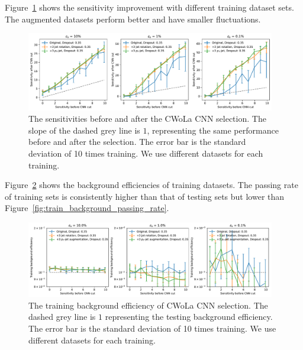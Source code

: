 \documentclass[12pt]{article}
\begin{document}
        Figure~\ref{fig:sensitivity_improvement_background_subtraction_dropout_35} shows the sensitivity improvement with different training dataset sets. The augmented datasets perform better and have smaller fluctuations. 
        \begin{figure}[htpb]
            \centering
            \includegraphics[width=0.97\textwidth]{HVmodel_sensitivity_improvement_origin_jet_aug_3_pt_jet_aug_3_bkg_subtraction_dp_35.pdf}
            \caption{The sensitivities before and after the CWoLa CNN selection. The slope of the dashed grey line is $1$, representing the same performance before and after the selection. The error bar is the standard deviation of 10 times training. We use different datasets for each training.}
            \label{fig:sensitivity_improvement_background_subtraction_dropout_35}
        \end{figure}

        Figure~\ref{fig:train_background_passing_rate_dropout_35} shows the background efficiencies of training datasets. The passing rate of training sets is consistently higher than that of testing sets but lower than Figure~\ref{fig:train_background_passing_rate}. 
        \begin{figure}[htpb]
            \centering
            \includegraphics[width=0.97\textwidth]{HVmodel_train_B_passing_rate_origin_jet_aug_3_pt_jet_aug_3_dp_35.pdf}
            \caption{The training background efficiency of CWoLa CNN selection. The dashed grey line is $1$ representing the testing background efficiency. The error bar is the standard deviation of 10 times training. We use different datasets for each training.}
            \label{fig:train_background_passing_rate_dropout_35}
        \end{figure}



\end{document}
